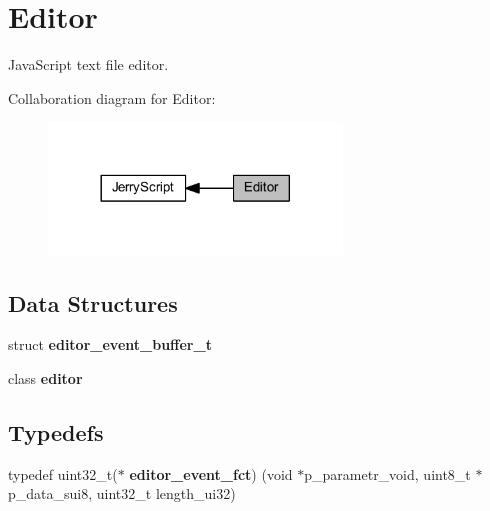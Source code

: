 \section{Editor}
\label{group___editor}


Java\+Script text file editor.  


Collaboration diagram for Editor\+:
\nopagebreak
\begin{figure}[H]
\begin{center}
\leavevmode
\includegraphics[width=221pt]{group___editor}
\end{center}
\end{figure}
\subsection*{Data Structures}
\begin{DoxyCompactItemize}
\item 
struct \textbf{ editor\+\_\+event\+\_\+buffer\+\_\+t}
\item 
class \textbf{ editor}
\end{DoxyCompactItemize}
\subsection*{Typedefs}
\begin{DoxyCompactItemize}
\item 
typedef uint32\+\_\+t($\ast$ \textbf{ editor\+\_\+event\+\_\+fct}) (void $\ast$p\+\_\+parametr\+\_\+void, uint8\+\_\+t $\ast$p\+\_\+data\+\_\+sui8, uint32\+\_\+t length\+\_\+ui32)
\end{DoxyCompactItemize}
